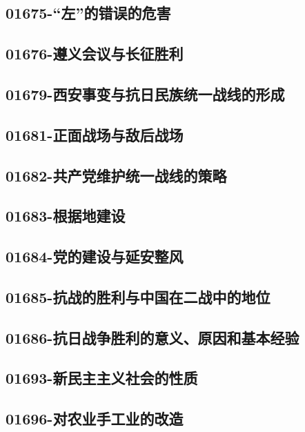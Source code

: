 \subsection{01675-“左”的错误的危害}

\subsection{01676-遵义会议与长征胜利}

\subsection{01679-西安事变与抗日民族统一战线的形成}

\subsection{01681-正面战场与敌后战场}

\subsection{01682-共产党维护统一战线的策略}

\subsection{01683-根据地建设}

\subsection{01684-党的建设与延安整风}

\subsection{01685-抗战的胜利与中国在二战中的地位}

\subsection{01686-抗日战争胜利的意义、原因和基本经验}

\subsection{01693-新民主主义社会的性质}

\subsection{01696-对农业手工业的改造}

